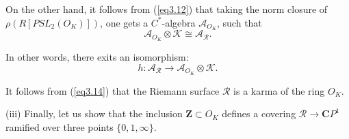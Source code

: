 \documentclass[10pt, reqno]{amsart}
\theoremstyle{definition}
\theoremstyle{remark}
\numberwithin{equation}{section}
\begin{document}
On the other hand, it follows from (\ref{eq3.12}) that  taking the norm closure of 
$\rho(R[PSL_2(O_K)])$,  one gets a $C^*$-algebra $\mathscr{A}_{O_K}$, 
such that 
\begin{equation}\label{eq3.13} 
\mathscr{A}_{O_K}\otimes\mathscr{K}\cong \mathscr{A}_{\mathscr{R}}. 
\end{equation}

In other words,  there exits an isomorphism:
\begin{equation}\label{eq3.14} 
h: \mathscr{A}_{\mathscr{R}}\to \mathscr{A}_{O_K}\otimes\mathscr{K}. 
\end{equation}

It follows from (\ref{eq3.14}) that  the Riemann surface $\mathscr{R}$ is a karma of 
the ring $O_K$. 


\bigskip
(iii) Finally, let us show that 
 the inclusion $\mathbf{Z}\subset O_K$ defines a covering $\mathscr{R}\to \mathbf{C}P^1$
ramified over three  points $\{0,1, \infty\}$. 
\end{document}
